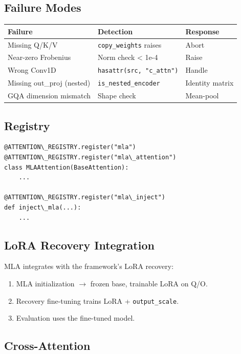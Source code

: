 \subsection{Failure Modes}

\begin{table}[H]
\centering
\small
\begin{tabular}{lll}
\toprule
\textbf{Failure} & \textbf{Detection} & \textbf{Response} \\
\midrule
Missing Q/K/V & \texttt{copy\_weights} raises & Abort \\
Near-zero Frobenius & Norm check \textless{} 1e-4 & Raise \\
Wrong Conv1D & \texttt{hasattr(src, "c\_attn")} & Handle \\
Missing out\_proj (nested) & \texttt{is\_nested\_encoder} & Identity matrix \\
GQA dimension mismatch & Shape check & Mean-pool \\
\bottomrule
\end{tabular}
\end{table}

\subsection{Registry}

\begin{lstlisting}
@ATTENTION\_REGISTRY.register("mla")
@ATTENTION\_REGISTRY.register("mla\_attention")
class MLAAttention(BaseAttention):
    ...

@ATTENTION\_REGISTRY.register("mla\_inject")
def inject\_mla(...):
    ...
\end{lstlisting}

\subsection{LoRA Recovery Integration}

MLA integrates with the framework's LoRA recovery:

\begin{enumerate}
\item MLA initialization $\to$ frozen base, trainable LoRA on Q/O.
\item Recovery fine-tuning trains LoRA + \texttt{output\_scale}.
\item Evaluation uses the fine-tuned model.

\end{enumerate}
\subsection{Cross-Attention}

